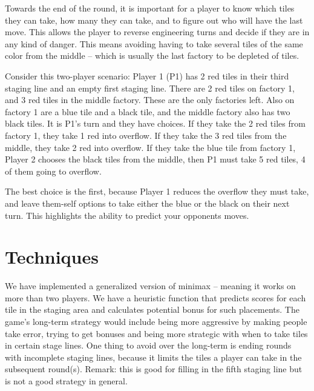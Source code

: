 \documentclass[12pt]{article}
\begin{document}
Towards the end of the round, it is important for a player to know which 
tiles they can take, how many they can take, and to figure out who will have the last move. This allows the player to reverse engineering turns and decide if they are 
in any kind of danger. This means avoiding having to take several tiles of the same color
from the middle -- which is usually the last factory to be depleted of tiles. 

Consider this two-player scenario: Player 1 (P1) has 2 red tiles in their third staging line and an empty first staging line.
There are 2 red tiles on factory 1, and 3 red tiles in the middle factory.
These are the only factories left. Also on factory 1 are a blue tile and a black tile, and
the middle factory also has two black tiles.
It is P1's turn and they have choices.
If they take the 2 red tiles from factory 1, they take 1 red into overflow.
If they take the 3 red tiles from the middle, they take 2 red into overflow.
If they take the blue tile from factory 1, Player 2 chooses the black tiles
from the middle, then P1 must take 5 red tiles, 4 of them going to overflow.

The best choice is the first, because Player 1 reduces the overflow they must take, and
leave them-self options to take either the blue or the black on their next turn.
This highlights the ability to predict your opponents moves.




\section{Techniques}

%
%

We have implemented a generalized version of minimax -- meaning it works on more than two players.
We have a heuristic function that predicts scores for each tile in the staging area and calculates potential bonus for such placements.
The game's long-term strategy would include being more aggressive by making people take error, trying to get bonuses and being more strategic 
with when to take tiles in certain stage lines. One thing to avoid over the long-term is ending rounds with 
incomplete staging lines, because it limits the tiles a player can take in the subsequent round(s). Remark: this is good for 
filling in the fifth staging line but is not a good strategy in general.
\end{document}
